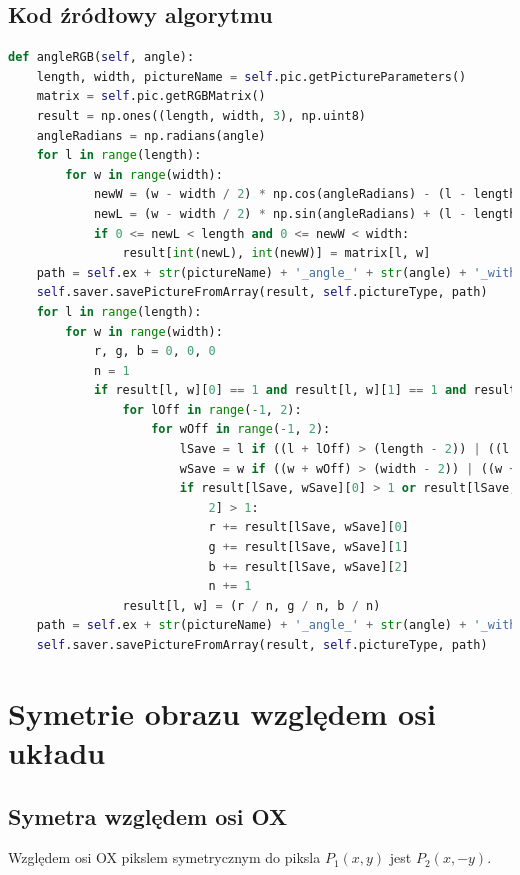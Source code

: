\documentclass[a4paper,12pt, titlepage]{report}
\begin{document}
\subsection*{Kod źródłowy algorytmu}
\begin{lstlisting}[language=Python]
def angleRGB(self, angle):
    length, width, pictureName = self.pic.getPictureParameters()
    matrix = self.pic.getRGBMatrix()
    result = np.ones((length, width, 3), np.uint8)
    angleRadians = np.radians(angle)
    for l in range(length):
        for w in range(width):
            newW = (w - width / 2) * np.cos(angleRadians) - (l - length / 2) * np.sin(angleRadians) + (width / 2)
            newL = (w - width / 2) * np.sin(angleRadians) + (l - length / 2) * np.cos(angleRadians) + (length / 2)
            if 0 <= newL < length and 0 <= newW < width:
                result[int(newL), int(newW)] = matrix[l, w]
    path = self.ex + str(pictureName) + '_angle_' + str(angle) + '_withoutInterpolation.png'
    self.saver.savePictureFromArray(result, self.pictureType, path)
    for l in range(length):
        for w in range(width):
            r, g, b = 0, 0, 0
            n = 1
            if result[l, w][0] == 1 and result[l, w][1] == 1 and result[l, w][2] == 1:
                for lOff in range(-1, 2):
                    for wOff in range(-1, 2):
                        lSave = l if ((l + lOff) > (length - 2)) | ((l + lOff) < 0) else (l + lOff)
                        wSave = w if ((w + wOff) > (width - 2)) | ((w + wOff) < 0) else (w + wOff)
                        if result[lSave, wSave][0] > 1 or result[lSave, wSave][1] > 1 or result[lSave, wSave][
                            2] > 1:
                            r += result[lSave, wSave][0]
                            g += result[lSave, wSave][1]
                            b += result[lSave, wSave][2]
                            n += 1
                result[l, w] = (r / n, g / n, b / n)
    path = self.ex + str(pictureName) + '_angle_' + str(angle) + '_withInterpolation.png'
    self.saver.savePictureFromArray(result, self.pictureType, path)
\end{lstlisting}

\section{Symetrie obrazu względem osi układu}
\subsection{Symetra względem osi OX}
\par Względem osi OX pikslem symetrycznym do piksla \(P_{1}(x,y)\) jest \(P_{2}(x,-y)\).
\end{document}
